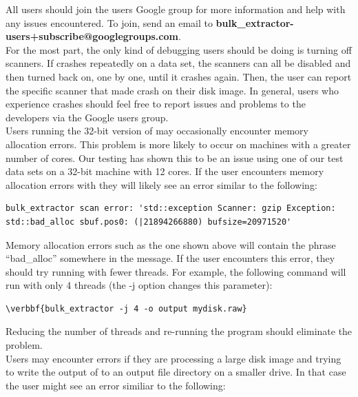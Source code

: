 \documentclass[11pt]{article} %
\begin{document}
All \bulk users should join the \bulk users Google group for more information and help with any issues encountered. To join, send an email to \textbf{bulk\_extractor-users+subscribe@googlegroups.com}.  \\

For the most part, the only kind of debugging \bulk users should be doing is turning off scanners. If \bulk crashes repeatedly on a data set, the scanners can all be disabled and then turned back on, one by one, until it crashes again. Then, the user can report the specific scanner that made \bulk crash on their disk image. In general, users who experience crashes should feel free to report issues and problems to the developers via the Google users group.\\

Users running the 32-bit version of \bulk may occasionally encounter memory allocation errors. This problem is more likely to occur on machines with a greater number of cores. Our testing has shown this to be an issue using one of our test data sets on a 32-bit machine with 12 cores.  If the user encounters memory allocation errors with \bulk they will likely see an error similar to the following:

\begingroup
\footnotesize
\begin{Verbatim}
bulk_extractor scan error: 'std::exception Scanner: gzip Exception:
std::bad_alloc sbuf.pos0: (|21894266880) bufsize=20971520'
\end{Verbatim}
\endgroup 
Memory allocation errors such as the one shown above will contain the phrase ``bad\_alloc'' somewhere in the message. If the user encounters this error, they should try running \bulk with fewer threads. For example, the following command will run \bulk with only 4 threads (the -j option changes this parameter):
\begin{Verbatim}[commandchars=\\\{\}]
\verbbf{bulk_extractor -j 4 -o output mydisk.raw}
\end{Verbatim}
Reducing the number of threads and re-running the program should eliminate the problem.\\

Users may encounter errors if they are processing a large disk image and trying to write the output of \bulk to an output file directory on a smaller drive. In that case the user might see an error similiar to the following:
\end{document}
